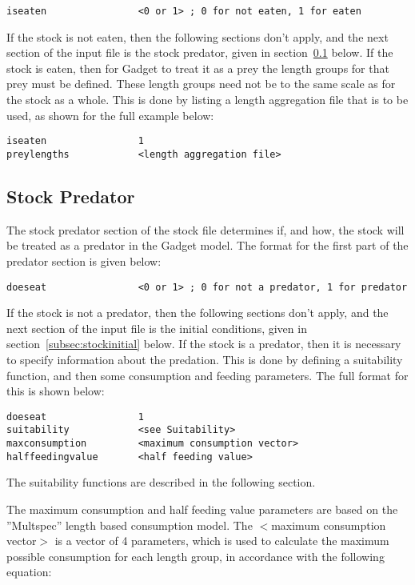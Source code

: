 \documentclass [a4paper, 10pt]{book}
\begin{document}
\begin{verbatim}
iseaten                <0 or 1> ; 0 for not eaten, 1 for eaten
\end{verbatim}

If the stock is not eaten, then the following sections don't apply, and the next section of the input file is the stock predator, given in section~\ref{subsec:stockpredator} below.  If the stock is eaten, then for Gadget to treat it as a prey the length groups for that prey must be defined.  These length groups need not be to the same scale as for the stock as a whole.  This is done by listing a length aggregation file that is to be used, as shown for the full example below:

\begin{verbatim}
iseaten                1
preylengths            <length aggregation file>
\end{verbatim}

\subsection{Stock Predator}\label{subsec:stockpredator}
The stock predator section of the stock file determines if, and how, the stock will be treated as a predator in the Gadget model.  The format for the first part of the predator section is given below:

\begin{verbatim}
doeseat                <0 or 1> ; 0 for not a predator, 1 for predator
\end{verbatim}

If the stock is not a predator, then the following sections don't apply, and the next section of the input file is the initial conditions, given in section~\ref{subsec:stockinitial} below.  If the stock is a predator, then it is necessary to specify information about the predation.  This is done by defining a suitability function, and then some consumption and feeding parameters.  The full format for this is shown below:

\begin{verbatim}
doeseat                1
suitability            <see Suitability>
maxconsumption         <maximum consumption vector>
halffeedingvalue       <half feeding value>
\end{verbatim}

The suitability functions are described in the following section.

\bigskip
The maximum consumption and half feeding value parameters are based on the ''Multspec'' length based consumption model.  The $<$maximum consumption vector$>$ is a vector of 4 parameters, which is used to calculate the maximum possible consumption for each length group, in accordance with the following equation:
\end{document}
